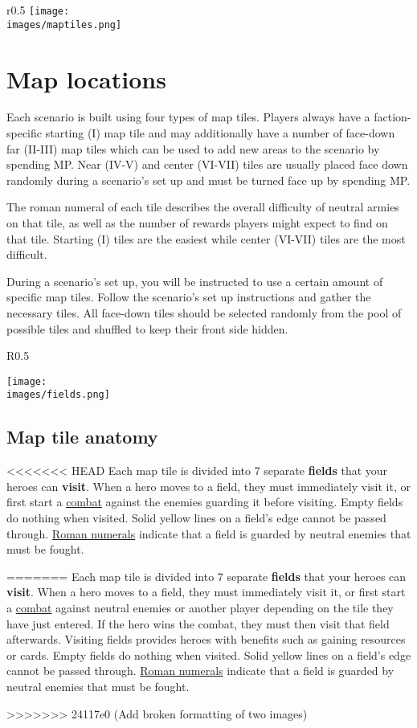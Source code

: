 \documentclass[12pt]{article}
\def\assets{assets}
\def\images{\assets/images}
\begin{document}
\clearpage

\begin{wrapfigure}{r}{0.5\textwidth}
\texttt{[image: \\images/maptiles.png]}
\end{wrapfigure}
\section{Map locations}
Each scenario is built using four types of map tiles. Players always have a faction-specific starting (I) map tile and may additionally have a number of face-down far (II-III) map tiles which can be used to add new areas to the scenario by spending MP. Near (IV-V) and center (VI-VII) tiles are usually placed face down randomly during a scenario’s set up and must be turned face up by spending MP.\par
The roman numeral of each tile describes the overall difficulty of neutral armies on that tile, as well as the number of rewards players might expect to find on that tile. Starting (I) tiles are the easiest while center (VI-VII) tiles are the most difficult.\par
During a scenario’s set up, you will be instructed to use a certain amount of specific map tiles. Follow the scenario’s set up instructions and gather the necessary tiles. All face-down tiles should be selected randomly from the pool of possible tiles and shuffled to keep their front side hidden.\par
\begin{wrapfigure}{R}{0.5\textwidth}
    \begin{center}
    \texttt{[image: \\images/fields.png]}
    \end{center}
\end{wrapfigure}
\subsection*{Map tile anatomy}
<<<<<<< HEAD
Each map tile is divided into 7 separate \textbf{fields} that your heroes can \textbf{visit}. When a hero moves to a field, they must immediately visit it, or 
first start a \hyperlink{Combat}{combat} against the enemies guarding it before visiting. Empty fields do nothing when visited. Solid yellow lines on a field's edge cannot be passed through. \hyperlink{Difficulty}{Roman numerals} indicate that a field is guarded by neutral enemies that must be fought.\par
=======
Each map tile is divided into 7 separate \textbf{fields} that your heroes can \textbf{visit}. When a hero moves to a field, they must immediately visit it, or
first start a \hyperlink{Combat}{combat} against neutral enemies or another player depending on the tile they have just entered. If the hero wins the combat, they must then visit that field afterwards. Visiting fields provides heroes with benefits such as gaining resources or cards. Empty fields do nothing when visited. Solid yellow lines on a field's edge cannot be passed through. \hyperlink{Difficulty}{Roman numerals} indicate that a field is guarded by neutral enemies that must be fought.\par
>>>>>>> 24117e0 (Add broken formatting of two images)
\end{document}
